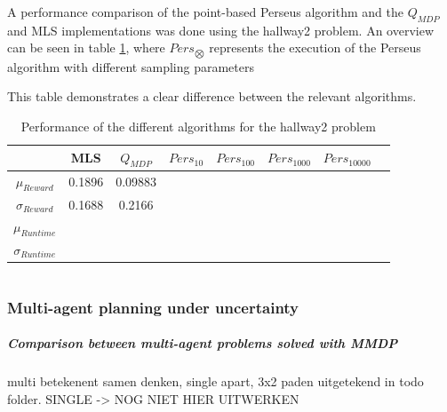 \documentclass[10pt,a4paper]{article}
\begin{document}
A performance comparison of the point-based Perseus algorithm and the $Q_{MDP}$ and MLS implementations was done using the hallway2 problem.
An overview can be seen in table \ref{table:performance}, where $Pers_{\bigotimes}$ represents the execution of the Perseus algorithm with different sampling parameters

This table demonstrates a clear difference between the relevant algorithms. 

\begin{table}
\centering
\begin{tabular}{ c || c | c | c | c | c | c | c}
\hfill & MLS & $Q_{MDP}$ & $Pers_{10}$ & $Pers_{100}$ & $Pers_{1000}$ & $Pers_{10000}$ \\
\hline
$\mu_{Reward}$ & 0.1896 & 0.09883 & & & & \\
$\sigma_{Reward}$ & 0.1688 & 0.2166 & & & & \\
\hline \hline
$\mu_{Runtime}$ & & & & & & \\
$\sigma_{Runtime}$ & & & & & &\\
\end{tabular}
\caption{Performance of the different algorithms for the hallway2 problem}
\label{table:performance}
\end{table}


\part{}


\section{Multi-agent planning under uncertainty}

\subsubsection*{Comparison between multi-agent problems solved with MMDP}
multi betekenent samen denken, single apart, 3x2 paden uitgetekend in todo folder. SINGLE -> NOG NIET HIER UITWERKEN
\end{document}
